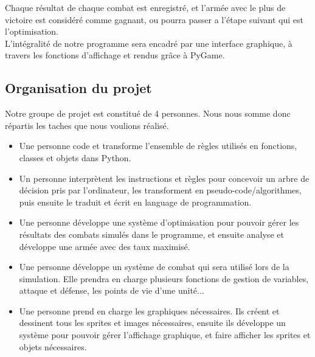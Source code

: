 \documentclass[a4paper, 11pt]{article}
\begin{document}
Chaque résultat de chaque combat est enregistré, et l'armée avec le plus de victoire est considéré comme gagnant, ou pourra passer a l'étape suivant qui est l'optimisation.\\

L’intégralité de notre programme sera encadré par une interface graphique, à travers les fonctions d'affichage et rendus grâce à PyGame. \\

\subsection{Organisation du projet}

Notre groupe de projet est constitué de 4 personnes. Nous nous somme donc répartis les taches que nous voulions réalisé.\\

\begin{itemize}

\item Une personne code et transforme l'ensemble de règles utilisés en fonctions, classes et objets dans Python. \\
\item Un personne interprètent les instructions et règles pour concevoir un arbre de décision pris par l'ordinateur, les transforment en pseudo-code/algorithmes, puis ensuite le traduit et écrit en language de programmation. \\

\item Une personne développe une système d'optimisation pour pouvoir gérer les résultats des combats simulés dans le programme, et ensuite analyse et développe une armée avec des taux maximisé. \\

\item Une personne développe un système de combat qui sera utilisé lors de la simulation. Elle prendra en charge plusieurs fonctions de gestion de variables, attaque et défense, les points de vie d'une unité... \\

\item Une personne prend en charge les graphiques nécessaires. Ils créent et dessinent tous les sprites et images nécessaires, ensuite ils développe un système pour pouvoir gérer l'affichage graphique, et faire afficher les sprites et objets nécessaires. \\

\end{itemize}
\end{document}
